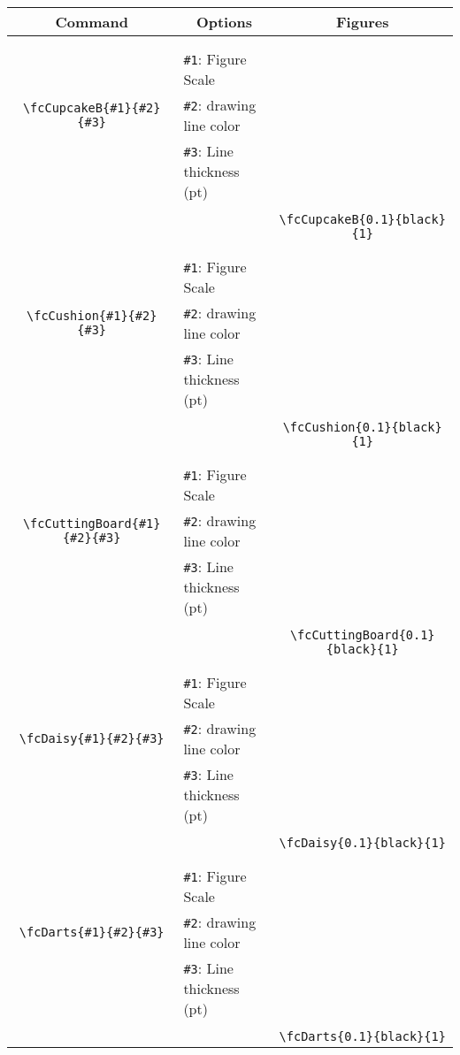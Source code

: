 \documentclass[x11names]{article}
\begin{document}
\begin{table}[H]\centering\begin{tabular}{|c|l|c|}\hline {\bf Command}& \multicolumn{1}{c|}{{\bf Options}} & {\bf Figures}\\  \hline	&&\multirow{5}{*}{\fcCupcakeB{0.1}{black}{1}}\\	&&\\	&\verb|#1|: Figure Scale &\\	\verb|\fcCupcakeB{#1}{#2}{#3}|&	\verb|#2|: drawing line color &\\	&\verb|#3|: Line thickness (pt) &\\ &&\\&&	\verb|\fcCupcakeB{0.1}{black}{1}|\\\hline 	
	&&\multirow{5}{*}{\fcCushion{0.1}{black}{1}}\\	&&\\	&\verb|#1|: Figure Scale &\\	\verb|\fcCushion{#1}{#2}{#3}|&	\verb|#2|: drawing line color &\\	&\verb|#3|: Line thickness (pt) &\\ &&\\&&	\verb|\fcCushion{0.1}{black}{1}|\\\hline 	
	&&\multirow{5}{*}{\fcCuttingBoard{0.1}{black}{1}}\\	&&\\	&\verb|#1|: Figure Scale &\\	\verb|\fcCuttingBoard{#1}{#2}{#3}|&	\verb|#2|: drawing line color &\\	&\verb|#3|: Line thickness (pt) &\\ &&\\&&	\verb|\fcCuttingBoard{0.1}{black}{1}|\\\hline 	
	&&\multirow{5}{*}{\fcDaisy{0.1}{black}{1}}\\	&&\\	&\verb|#1|: Figure Scale &\\	\verb|\fcDaisy{#1}{#2}{#3}|&	\verb|#2|: drawing line color &\\	&\verb|#3|: Line thickness (pt) &\\ &&\\&&	\verb|\fcDaisy{0.1}{black}{1}|\\\hline 	
	&&\multirow{5}{*}{\fcDarts{0.1}{black}{1}}\\	&&\\	&\verb|#1|: Figure Scale &\\	\verb|\fcDarts{#1}{#2}{#3}|&	\verb|#2|: drawing line color &\\	&\verb|#3|: Line thickness (pt) &\\ &&\\&&	\verb|\fcDarts{0.1}{black}{1}|\\\hline 	

\end{tabular}
\end{table}
\end{document}
